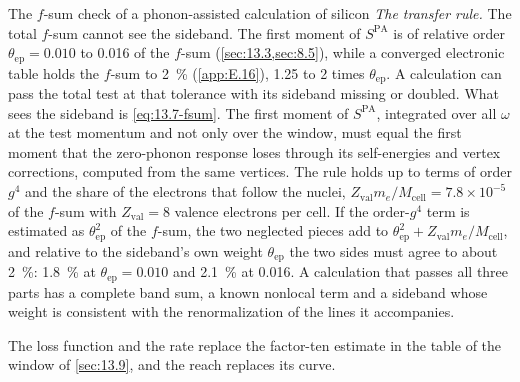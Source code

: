 \begin{workedexample}{The $f$-sum check of a phonon-assisted calculation of silicon}
\emph{The transfer rule.} The total $f$-sum cannot see the sideband. The first moment of $S^{\mathrm{PA}}$ is of relative order $\theta_{\mathrm{ep}} = 0.010$ to 0.016 of the $f$-sum (\cref{sec:13.3,sec:8.5}), while a converged electronic table holds the $f$-sum to \SI{2}{\percent} (\cref{app:E.16}), 1.25 to 2 times $\theta_{\mathrm{ep}}$. A calculation can pass the total test at that tolerance with its sideband missing or doubled. What sees the sideband is \cref{eq:13.7-fsum}. The first moment of $S^{\mathrm{PA}}$, integrated over all $\omega$ at the test momentum and not only over the window, must equal the first moment that the zero-phonon response loses through its self-energies and vertex corrections, computed from the same vertices. The rule holds up to terms of order $g^4$ and the share of the electrons that follow the nuclei, $Z_{\mathrm{val}}m_e/M_{\mathrm{cell}} = 7.8\times10^{-5}$ of the $f$-sum with $Z_{\mathrm{val}} = 8$ valence electrons per cell. If the order-$g^4$ term is estimated as $\theta_{\mathrm{ep}}^2$ of the $f$-sum, the two neglected pieces add to $\theta_{\mathrm{ep}}^2 + Z_{\mathrm{val}}m_e/M_{\mathrm{cell}}$, and relative to the sideband's own weight $\theta_{\mathrm{ep}}$ the two sides must agree to about \SI{2}{\percent}: \SI{1.8}{\percent} at $\theta_{\mathrm{ep}} = 0.010$ and \SI{2.1}{\percent} at 0.016. A calculation that passes all three parts has a complete band sum, a known nonlocal term and a sideband whose weight is consistent with the renormalization of the lines it accompanies.
\end{workedexample}

The loss function and the rate replace the factor-ten estimate in the table of the window of \cref{sec:13.9}, and the reach replaces its curve.
